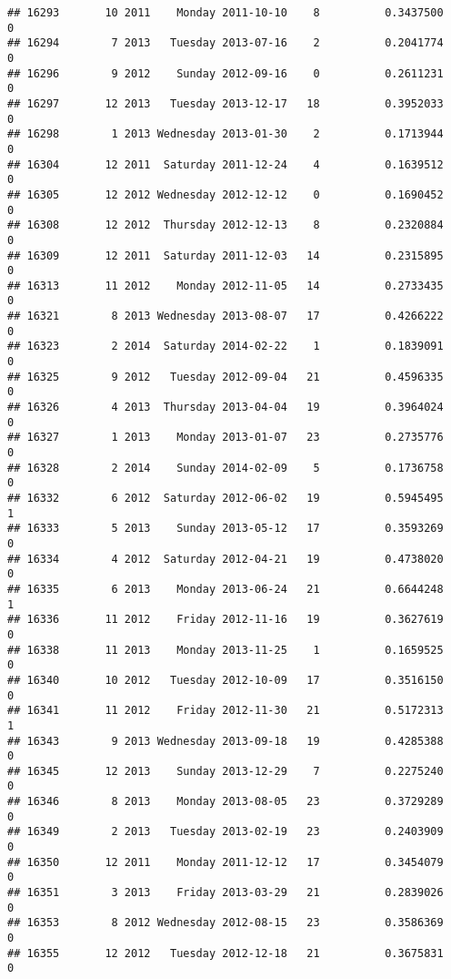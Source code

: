 \documentclass[
]{article}
\begin{document}
\begin{verbatim}
## 16293       10 2011    Monday 2011-10-10    8          0.3437500             0
## 16294        7 2013   Tuesday 2013-07-16    2          0.2041774             0
## 16296        9 2012    Sunday 2012-09-16    0          0.2611231             0
## 16297       12 2013   Tuesday 2013-12-17   18          0.3952033             0
## 16298        1 2013 Wednesday 2013-01-30    2          0.1713944             0
## 16304       12 2011  Saturday 2011-12-24    4          0.1639512             0
## 16305       12 2012 Wednesday 2012-12-12    0          0.1690452             0
## 16308       12 2012  Thursday 2012-12-13    8          0.2320884             0
## 16309       12 2011  Saturday 2011-12-03   14          0.2315895             0
## 16313       11 2012    Monday 2012-11-05   14          0.2733435             0
## 16321        8 2013 Wednesday 2013-08-07   17          0.4266222             0
## 16323        2 2014  Saturday 2014-02-22    1          0.1839091             0
## 16325        9 2012   Tuesday 2012-09-04   21          0.4596335             0
## 16326        4 2013  Thursday 2013-04-04   19          0.3964024             0
## 16327        1 2013    Monday 2013-01-07   23          0.2735776             0
## 16328        2 2014    Sunday 2014-02-09    5          0.1736758             0
## 16332        6 2012  Saturday 2012-06-02   19          0.5945495             1
## 16333        5 2013    Sunday 2013-05-12   17          0.3593269             0
## 16334        4 2012  Saturday 2012-04-21   19          0.4738020             0
## 16335        6 2013    Monday 2013-06-24   21          0.6644248             1
## 16336       11 2012    Friday 2012-11-16   19          0.3627619             0
## 16338       11 2013    Monday 2013-11-25    1          0.1659525             0
## 16340       10 2012   Tuesday 2012-10-09   17          0.3516150             0
## 16341       11 2012    Friday 2012-11-30   21          0.5172313             1
## 16343        9 2013 Wednesday 2013-09-18   19          0.4285388             0
## 16345       12 2013    Sunday 2013-12-29    7          0.2275240             0
## 16346        8 2013    Monday 2013-08-05   23          0.3729289             0
## 16349        2 2013   Tuesday 2013-02-19   23          0.2403909             0
## 16350       12 2011    Monday 2011-12-12   17          0.3454079             0
## 16351        3 2013    Friday 2013-03-29   21          0.2839026             0
## 16353        8 2012 Wednesday 2012-08-15   23          0.3586369             0
## 16355       12 2012   Tuesday 2012-12-18   21          0.3675831             0

\end{verbatim}
\end{document}

